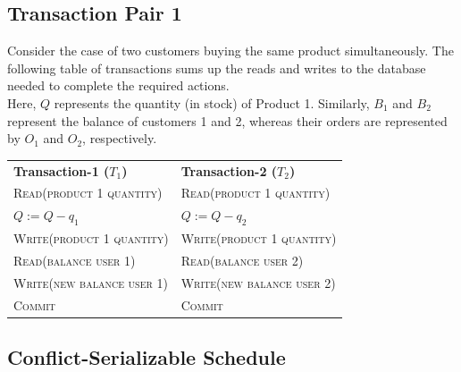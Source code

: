 \documentclass[12pt]{report}
\begin{document}
    \subsection*{Transaction Pair 1}
    Consider the case of two customers buying the same product simultaneously.
    The following table of transactions sums up the reads and writes to the database needed to complete the required actions. \\
    Here, $Q$ represents the quantity (in stock) of Product 1. Similarly, $B_{1}$ and $B_{2}$ represent the balance of
    customers 1 and 2, whereas their orders are represented by $O_{1}$ and $O_{2}$, respectively.

    \begin{center}
        \begin{adjustbox}{width=\textwidth}
            \begin{tabularx}{\textwidth}{|X|X|}
            \hline
            \multirow{2}{*}{\textbf{Transaction-1 ($T_{1}$)}} & \multirow{2}{*}{\textbf{Transaction-2 ($T_{2}$)}} \\
            & \\ \hline
            \textsc{Read(product 1 quantity)} & \textsc{Read(product 1 quantity)} \\
            $Q := Q - q_{1}$ & $Q := Q - q_{2}$ \\
            \textsc{Write(product 1 quantity)} & \textsc{Write(product 1 quantity)} \\
            \textsc{Read(balance user 1)} & \textsc{Read(balance user 2)} \\
            \textsc{Write(new balance user 1)} & \textsc{Write(new balance user 2)} \\
            \textsc{Commit} & \textsc{Commit} \\
            \hline
            \end{tabularx}
        \end{adjustbox}
    \end{center}
    \vspace*{2.5pt}

    \subsection*{Conflict-Serializable Schedule}
\end{document}
